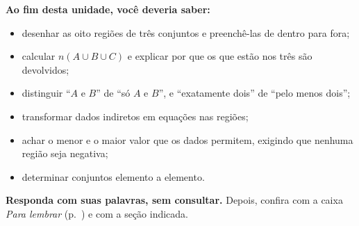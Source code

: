 \begin{sintese}
\textbf{Ao fim desta unidade, você deveria saber:}
\begin{itemize}[leftmargin=1.4em,itemsep=1pt]
  \item desenhar as oito regiões de três conjuntos e preenchê-las de dentro para fora;
  \item calcular $n(A\cup B\cup C)$ e explicar por que os que estão nos três são devolvidos;
  \item distinguir \enquote{$A$ e $B$} de \enquote{só $A$ e $B$}, e \enquote{exatamente dois} de \enquote{pelo menos dois};
  \item transformar dados indiretos em equações nas regiões;
  \item achar o menor e o maior valor que os dados permitem, exigindo que nenhuma região seja negativa;
  \item determinar conjuntos elemento a elemento.
\end{itemize}
\smallskip\noindent\textbf{Responda com suas palavras, sem consultar.} Depois, confira com a caixa \emph{Para lembrar} (p.~\pageref{lembrar-u6}) e com a seção indicada.
\begin{enumerate}[label=\arabic*.,leftmargin=1.4em]
\end{enumerate}
\end{sintese}

\Respostas
{\small{}}

